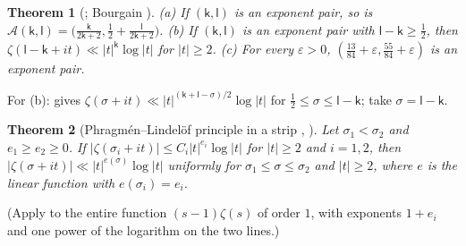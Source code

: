 \documentclass[preprint,12pt]{elsarticle}
\numberwithin{equation}{section}
\theoremstyle{plain}
\newtheorem{theorem}{Theorem}[section]
\theoremstyle{definition}
\theoremstyle{remark}
\begin{document}
\begin{theorem}[{\cite[Lemma~2.8 and (7.57)]{Ivic1985}}; Bourgain {\cite[\S5, Thm.~6]{Bourgain2017}}]\label{thm:known_exponents}
(a) If $(\mathsf k,\mathsf l)$ is an exponent pair, so is $\mathscr A(\mathsf k,\mathsf l)=\bigl(\frac{\mathsf k}{2\mathsf k+2},\frac12+\frac{\mathsf l}{2\mathsf k+2}\bigr)$. (b) If $(\mathsf k,\mathsf l)$ is an exponent pair with $\mathsf l-\mathsf k\ge\frac12$, then $\zeta(\mathsf l-\mathsf k+it)\ll|t|^{\mathsf k}\log|t|$ for $|t|\ge2$. (c) For every $\varepsilon>0$, $(\frac{13}{84}+\varepsilon,\frac{55}{84}+\varepsilon)$ is an exponent pair.
\end{theorem}
For (b): \cite[(7.57)]{Ivic1985} gives $\zeta(\sigma+it)\ll|t|^{(\mathsf k+\mathsf l-\sigma)/2}\log|t|$ for $\frac12\le\sigma\le\mathsf l-\mathsf k$; take $\sigma=\mathsf l-\mathsf k$.

\begin{theorem}[Phragm\'en--Lindel\"of principle in a strip {\cite[Lemma~2.5]{BellottiWong2025}}, {\cite[Lemma~3]{Trudgian2014}}]\label{thm:known_PL}
Let $\sigma_1<\sigma_2$ and $e_1\ge e_2\ge0$. If $|\zeta(\sigma_i+it)|\le C_i|t|^{e_i}\log|t|$ for $|t|\ge2$ and $i=1,2$, then $|\zeta(\sigma+it)|\ll|t|^{e(\sigma)}\log|t|$ uniformly for $\sigma_1\le\sigma\le\sigma_2$ and $|t|\ge2$, where $e$ is the linear function with $e(\sigma_i)=e_i$.
\end{theorem}
(Apply \cite[Lemma~2.5]{BellottiWong2025} to the entire function $(s-1)\zeta(s)$ of order $1$, with exponents $1+e_i$ and one power of the logarithm on the two lines.)
\end{document}
